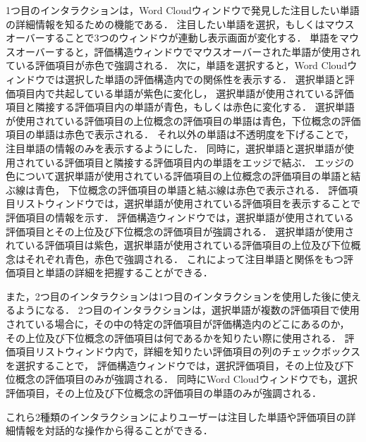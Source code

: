 \documentclass[syuuron]{kuee}
\begin{document}
			1つ目のインタラクションは，Word Cloudウィンドウで発見した注目したい単語の詳細情報を知るための機能である．
			注目したい単語を選択，もしくはマウスオーバーすることで3つのウィンドウが連動し表示画面が変化する．
			単語をマウスオーバーすると，評価構造ウィンドウでマウスオーバーされた単語が使用されている評価項目が赤色で強調される．
			次に，単語を選択すると，Word Cloudウィンドウでは選択した単語の評価構造内での関係性を表示する．
			選択単語と評価項目内で共起している単語が紫色に変化し，
			選択単語が使用されている評価項目と隣接する評価項目内の単語が青色，もしくは赤色に変化する．
			選択単語が使用されている評価項目の上位概念の評価項目の単語は青色，下位概念の評価項目の単語は赤色で表示される．
			それ以外の単語は不透明度を下げることで，注目単語の情報のみを表示するようにした．
			同時に，選択単語と選択単語が使用されている評価項目と隣接する評価項目内の単語をエッジで結ぶ．
			エッジの色について選択単語が使用されている評価項目の上位概念の評価項目の単語と結ぶ線は青色，
			下位概念の評価項目の単語と結ぶ線は赤色で表示される．
			評価項目リストウィンドウでは，選択単語が使用されている評価項目を表示することで評価項目の情報を示す．
			評価構造ウィンドウでは，選択単語が使用されている評価項目とその上位及び下位概念の評価項目が強調される．
			選択単語が使用されている評価項目は紫色，選択単語が使用されている評価項目の上位及び下位概念はそれぞれ青色，赤色で強調される．
			これによって注目単語と関係をもつ評価項目と単語の詳細を把握することができる．
			
			また，2つ目のインタラクションは1つ目のインタラクションを使用した後に使えるようになる．
			2つ目のインタラクションは，選択単語が複数の評価項目で使用されている場合に，その中の特定の評価項目が評価構造内のどこにあるのか，
			その上位及び下位概念の評価項目は何であるかを知りたい際に使用される．
			評価項目リストウィンドウ内で，詳細を知りたい評価項目の列のチェックボックスを選択することで，
			評価構造ウィンドウでは，選択評価項目，その上位及び下位概念の評価項目のみが強調される．
			同時にWord Cloudウィンドウでも，選択評価項目，その上位及び下位概念の評価項目の単語のみが強調される．
			
			これら2種類のインタラクションによりユーザーは注目した単語や評価項目の詳細情報を対話的な操作から得ることができる．
			
\end{document}
